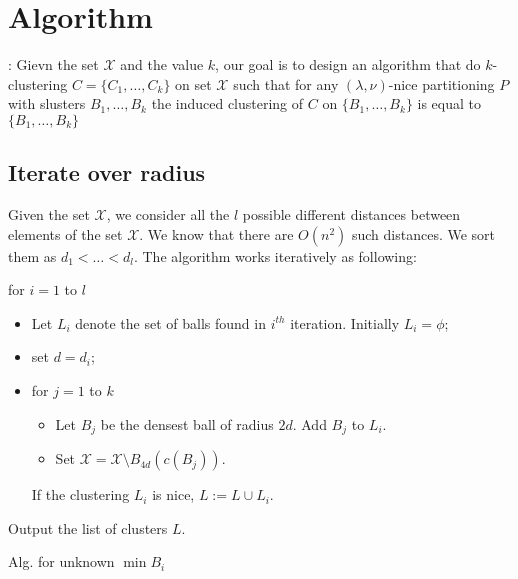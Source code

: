\documentclass[11pt]{article}
\newenvironment{alg}{
    \begin{list}{}{
        \setlength{\itemsep}{2pt}
        \setlength{\parsep}{0pt}
        \setlength{\parskip}{0pt}
        \setlength{\topsep}{1pt}
    }
}
{
    \end{list}
}
\begin{document}
\section{Algorithm}


: Gievn the set $\mathcal{X}$ and the value $k$, our goal is to design an algorithm that do $k$-clustering $C=\{C_1,\ldots,C_k\}$ on set $\mathcal{X}$ such that  for any $(\lambda,\nu)$-nice partitioning $P$ with slusters $B_1,\ldots,B_k$ the induced clustering of $C$ on $\{B_1,\ldots,B_k\}$ is equal to $\{B_1,\ldots,B_k\}$

\subsection{Iterate over radius}

Given the set $\mathcal{X}$,
we consider all the $l$ possible different distances between elements of the set $\mathcal{X}$. We know that there are $O(n^2)$ such distances. We sort them as $d_1<\ldots<d_l$. The algorithm works iteratively as following:


\begin{algorithm}
\begin{alg}

\item[] for $i=1$ to $l$
\begin{itemize}

\item[] Let $L_i$ denote the set of balls found in $i^{th}$ iteration. Initially $L_i=\phi$;
\item[] set $d=d_i$;


\item[] for $j=1$ to $k$

\begin{itemize}

\item[] Let $B_j$ be the densest ball of radius $2d$. Add $B_j$ to $L_i$.
\item[] Set $\mathcal{X}=\mathcal{X}\setminus B_{4d}(c(B_j))$. 

\end{itemize}
If the clustering $L_i$ is nice, $L := L \cup L_i$.
\end{itemize}

Output the list of clusters $L$.
\label{alg:NotKnown}
\end{alg}
\caption{Alg. for unknown $\min{B_i}$}
\end{algorithm}
\end{document}
